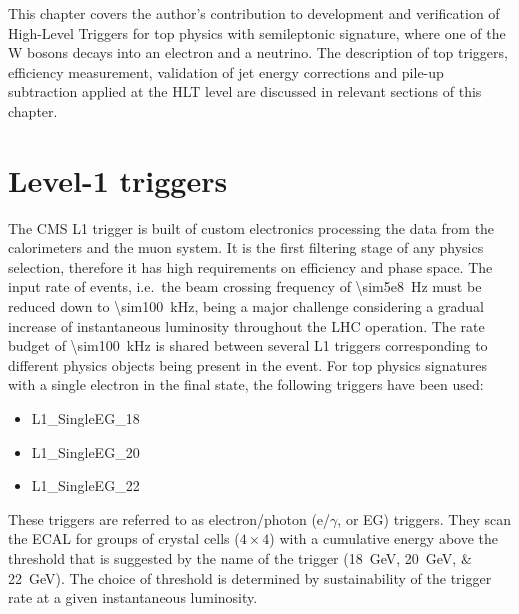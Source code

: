 This chapter covers the author's contribution to development and verification of High-Level Triggers for top physics
with semileptonic signature, where one of the W bosons decays into an electron and a neutrino. The description of top
triggers, efficiency measurement, validation of jet energy corrections and pile-up subtraction applied at the HLT level
are discussed in relevant sections of this chapter.

\section{Level-1 triggers}
The CMS L1 trigger \cite{CMS_L1_Trigger_TDR} is built of custom electronics processing the data from the calorimeters
and the muon system. It is the first filtering stage of any physics selection, therefore it has high requirements on
efficiency and phase space. The input rate of events, i.e.\ the beam crossing frequency of \SI{\sim5e8}{\hertz} must be
reduced down to \SI{\sim100}{\kilo\hertz}, being a major challenge considering a gradual increase of instantaneous
luminosity throughout the LHC operation. The rate budget of \SI{\sim100}{\kilo\hertz} is shared between several L1
triggers corresponding to different physics objects being present in the event. For top physics signatures with a single
electron in the final state, the following triggers have been used:

\begin{itemize}
 \item L1\_SingleEG\_18
 \item L1\_SingleEG\_20
 \item L1\_SingleEG\_22
\end{itemize}

These triggers are referred to as electron/photon (e/$\gamma$, or EG) triggers. They scan the ECAL for groups of crystal
cells ($4 \times 4$) with a cumulative energy above the threshold that is suggested by the name of the trigger
(\SIlist{18;20;22}{\GeV}). The choice of threshold is determined by sustainability of the trigger rate at a given
instantaneous luminosity.

